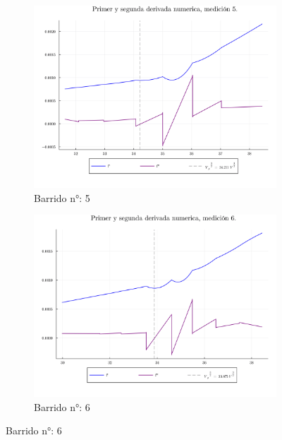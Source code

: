 \begin{figure}[H]
\ContinuedFloat %
\centering
\begin{subfigure}[b]{0.49\textwidth}
	\centering
	\includegraphics[width=\linewidth]{img/potderps5.png}
	\caption{Barrido n°: 5}
	\label{fig:potderps5}
\end{subfigure}
\hfill
\begin{subfigure}[b]{0.49\textwidth}
	\centering
	\includegraphics[width=\linewidth]{img/potderps6.png}
	\caption{Barrido n°: 6}
	\label{fig:potderps6}
\end{subfigure}

\end{figure}

